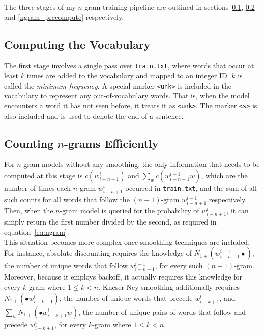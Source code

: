 \documentclass[a4paper, 12pt]{report}
\newcommand{\ttt}[1]{\texttt{#1}}
\newcommand{\tit}[1]{\textit{#1}}
\begin{document}
The three stages of my $n$-gram training pipeline are outlined in sections~\ref{ngram_compute_vocab}, \ref{ngram_count} and \ref{ngram_precompute} respectively.

\subsection{Computing the Vocabulary} \label{ngram_compute_vocab}

The first stage involves a single pass over \ttt{train.txt}, where words that occur at least $k$ times are added to the vocabulary and mapped to an integer ID. $k$ is called the \tit{minimum frequency}. A special marker \ttt{<unk>} is included in the vocabulary to represent any out-of-vocabulary words. That is, when the model encounters a word it has not seen before, it treats it as \ttt{<unk>}. The marker \ttt{<s>} is also included and is used to denote the end of a sentence.

\subsection{Counting $n$-grams Efficiently} \label{ngram_count}

For $n$-gram models without any smoothing, the only information that needs to be computed at this stage is $c(w_{i - n + 1}^{i})$ and $\sum_w c(w_{i - n + 1}^{i - 1}w)$, which are the number of times each $n$-gram $w_{i - n + 1}^i$ occurred in \ttt{train.txt}, and the sum of all such counts for all words that follow the $(n-1)$-gram $w_{i - n + 1}^{i - 1}$ respectively. Then, when the $n$-gram model is queried for the probability of $w_{i - n + 1}^i$, it can simply return the first number divided by the second, as required in equation~\ref{eq:ngram}. \\

This situation becomes more complex once smoothing techniques are included. For instance, absolute discounting requires the knowledge of $N_{1+}(w_{i - n + 1}^{i - 1}\bullet)$, the number of unique words that follow $w_{i - n + 1}^{i - 1}$, for every such $(n - 1)$-gram. Moreover, because it employs backoff, it actually requires this knowledge for every $k$-gram where $1 \leq k < n$. Kneser-Ney smoothing additionally requires $N_{1+}(\bullet w_{i - k + 1}^i)$, the number of unique words that precede $w_{i - k + 1}^i$, and $\sum_w N_{1+}(\bullet w_{i - k + 1}^iw)$, the number of unique pairs of words that follow and precede $w_{i - k + 1}^i$, for every $k$-gram where $1 \leq k < n$. \\
\end{document}
